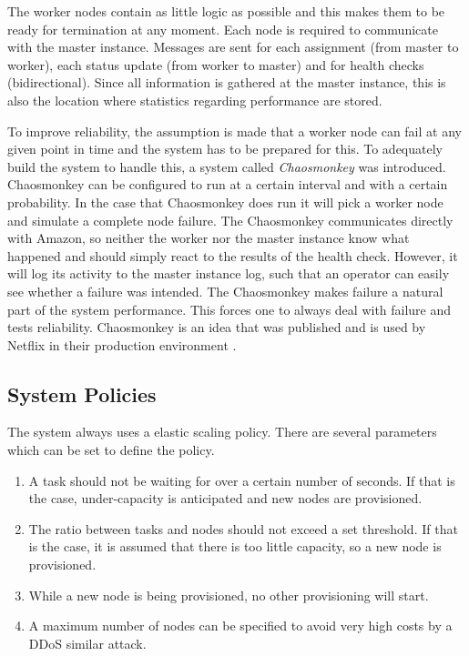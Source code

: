 \documentclass[a4paper]{IEEEtran}
\begin{document}
The worker nodes contain as little logic as possible and this makes them to be ready for termination at any moment.
Each node is required to communicate with the master instance.
Messages are sent for each assignment (from master to worker), each status update (from worker to master) and for health checks (bidirectional).
Since all information is gathered at the master instance, this is also the location where statistics regarding performance are stored.

To improve reliability, the assumption is made that a worker node can fail at any given point in time
and the system has to be prepared for this.
To adequately build the system to handle this, a system called \textit{Chaosmonkey} was introduced.
Chaosmonkey can be configured to run at a certain interval and with a certain probability.
In the case that Chaosmonkey does run it will pick a worker node 
and simulate a complete node failure.
The Chaosmonkey communicates directly with Amazon, so neither the worker nor the master instance know what happened and should simply react to the results of the health check.
However, it will log its activity to the master instance log, such that an operator can easily see whether a failure was intended.
The Chaosmonkey makes failure a natural part of the system performance.
This forces one to always deal with failure and tests reliability.
Chaosmonkey is an idea that was published and is used by Netflix in their production environment \cite{Netflix-cm}.

\subsection{System Policies}

The system always uses a elastic scaling policy. There are several parameters which can be set to define the policy.

\begin{enumerate}
\item A task should not be waiting for over a certain number of seconds.
If that is the case, under-capacity is anticipated and new nodes are provisioned.
\item The ratio between tasks and nodes should not exceed a set threshold. 
If that is the case, it is assumed that there is too little capacity, so a new node is provisioned.
\item While a new node is being provisioned, no other provisioning will start.
\item A maximum number of nodes can be specified to avoid very high costs by a DDoS similar attack.
\end{enumerate}
\end{document}
